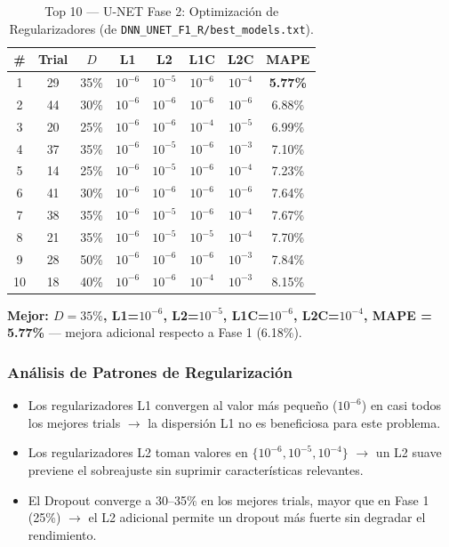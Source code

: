 \documentclass{article}
\begin{document}
\begin{table}[htbp]
\centering
\caption{Top 10 — U-NET Fase 2: Optimización de Regularizadores (de \texttt{DNN\_UNET\_F1\_R/best\_models.txt}).}
\label{tab:unet-phase2}
\begin{tabular}{cccccccc}
\hline
\# & Trial & $D$ & L1 & L2 & L1C & L2C & MAPE \\
\hline
1 & 29 & 35\% & $10^{-6}$ & $10^{-5}$ & $10^{-6}$ & $10^{-4}$ & \textbf{5.77\%} \\
2 & 44 & 30\% & $10^{-6}$ & $10^{-6}$ & $10^{-6}$ & $10^{-6}$ & 6.88\% \\
3 & 20 & 25\% & $10^{-6}$ & $10^{-6}$ & $10^{-4}$ & $10^{-5}$ & 6.99\% \\
4 & 37 & 35\% & $10^{-6}$ & $10^{-5}$ & $10^{-6}$ & $10^{-3}$ & 7.10\% \\
5 & 14 & 25\% & $10^{-6}$ & $10^{-5}$ & $10^{-6}$ & $10^{-4}$ & 7.23\% \\
6 & 41 & 30\% & $10^{-6}$ & $10^{-6}$ & $10^{-6}$ & $10^{-6}$ & 7.64\% \\
7 & 38 & 35\% & $10^{-6}$ & $10^{-5}$ & $10^{-6}$ & $10^{-4}$ & 7.67\% \\
8 & 21 & 35\% & $10^{-6}$ & $10^{-5}$ & $10^{-5}$ & $10^{-4}$ & 7.70\% \\
9 & 28 & 50\% & $10^{-6}$ & $10^{-6}$ & $10^{-6}$ & $10^{-3}$ & 7.84\% \\
10& 18 & 40\% & $10^{-6}$ & $10^{-6}$ & $10^{-4}$ & $10^{-3}$ & 8.15\% \\
\hline
\end{tabular}
\end{table}

\textbf{Mejor: $D=35\%$, L1=$10^{-6}$, L2=$10^{-5}$, L1C=$10^{-6}$, L2C=$10^{-4}$, MAPE = 5.77\%} — mejora adicional respecto a Fase 1 (6.18\%).

\subsubsection{Análisis de Patrones de Regularización}
\begin{itemize}
\item Los regularizadores L1 convergen al valor más pequeño ($10^{-6}$) en casi todos los mejores trials $\rightarrow$ la dispersión L1 no es beneficiosa para este problema.
\item Los regularizadores L2 toman valores en $\{10^{-6}, 10^{-5}, 10^{-4}\}$ $\rightarrow$ un L2 suave previene el sobreajuste sin suprimir características relevantes.
\item El Dropout converge a 30--35\% en los mejores trials, mayor que en Fase 1 (25\%) $\rightarrow$ el L2 adicional permite un dropout más fuerte sin degradar el rendimiento.
\end{itemize}
\end{document}
